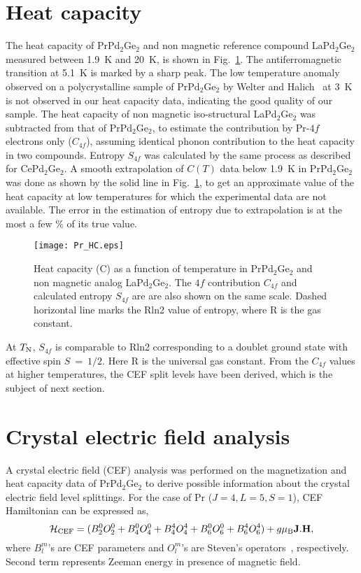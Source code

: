 \documentclass[preprint,showpacs,preprintnumbers,amsmath,amssymb, prb]{revtex4}
\begin{document}
\section{Heat capacity}
%
The heat capacity of PrPd$_2$Ge$_2$ and non magnetic reference compound LaPd$_2$Ge$_2$ measured between 1.9~K and 20~K, is shown in Fig.~\ref{Pr_HC}.
The antiferromagnetic transition at 5.1~K is marked by a sharp peak. The low temperature anomaly observed on a polycrystalline sample of PrPd$_2$Ge$_2$ by Welter and Halich~\cite{Welter} at 3~K is not observed in our heat capacity data, indicating the good quality of our sample.  The heat capacity of non magnetic iso-structural LaPd$_2$Ge$_2$ was subtracted from that of PrPd$_2$Ge$_2$, to estimate the contribution by Pr-$4f$ electrons only ($C_{4f}$), assuming identical phonon contribution to the heat capacity in two compounds. Entropy  $S_{4f}$  was calculated by the same process as described for  CePd$_2$Ge$_2$. A smooth extrapolation of $C(T)$ data below 1.9~K in PrPd$_2$Ge$_2$ was done as shown by the solid line in Fig.~\ref{Pr_HC}, to get an approximate value of the heat capacity at low temperatures for which the experimental data are not available. The error in the estimation of entropy due to extrapolation is at the most a few \% of its true value.
%
\begin{figure}[!]
\centering
\texttt{[image: Pr\_HC.eps]}
\caption{\label{Pr_HC}  Heat capacity (C) as a function of temperature in PrPd$_2$Ge$_2$ and non magnetic analog LaPd$_2$Ge$_2$. The $4f$ contribution $C_{4f}$ and calculated entropy $S_{4f}$ are are also shown on the same scale. Dashed horizontal line marks the Rln2 value of entropy, where R is the gas constant.}
\end{figure}
%
 At $T_{\rm N}$, $S_{4f}$ is comparable to Rln2  corresponding to a doublet ground state with effective spin $S~=~1/2$. Here R is the universal gas constant. From the $C_{4f}$ values at higher temperatures, the CEF split levels have been derived, which is the subject of next section. 
%
\section{Crystal electric field  analysis}\label{PrCEF}
A crystal electric field (CEF) analysis was performed on the magnetization and heat capacity data of PrPd$_2$Ge$_2$ to derive possible information about the crystal electric field level splittings. For the case of Pr ($J=4, L=5, S=1$), CEF Hamiltonian can be expressed as,
%
\begin{equation}
\label{eqn_CEF_Hamiltonial}
\mathcal{H}_{{\rm CEF}}=(B_{2}^{0}O_{2}^{0}+B_{4}^{0}O_{4}^{0}+B_{4}^{4}O_{4}^{4}+  B_{6}^{0}O_{6}^{0} + B_{6}^{4}O_{6}^{4})+g\mu_{\rm B}\textbf{J}.\textbf{H},
\end{equation}
%
where $B_{l}^{m}$'s are CEF parameters and $O_{l}^{m}$'s are Steven's operators~\cite{Hutchings, Stevens}, respectively. Second term represents Zeeman energy in presence of magnetic field.
\end{document}
